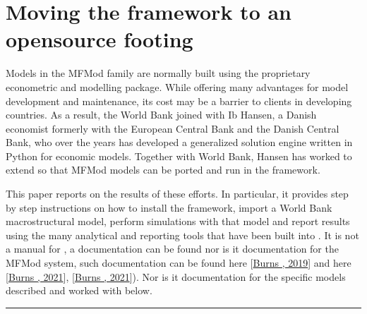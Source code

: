 \documentclass[letterpaper,10pt,english]{jupyterBook}
\begin{document}
\section{Moving the framework to an open\sphinxhyphen{}source footing}
\label{\detokenize{content/01_Introduction/Introduction:moving-the-framework-to-an-open-source-footing}}
\sphinxAtStartPar
Models in the MFMod family are normally built using the proprietary  econometric and modelling package. While offering many advantages for model development and maintenance, its cost may be a barrier to clients in developing countries.  As a result, the World Bank joined with Ib Hansen, a Danish economist formerly with the European Central Bank and the Danish Central Bank, who over the years has developed  a generalized solution engine written in Python for economic models. Together with World Bank, Hansen has worked to extend  so that MFMod models can be ported and run in the framework.

\sphinxAtStartPar
This paper reports on the results of these efforts. In particular, it provides step by step instructions on how to install the  framework, import a World Bank macrostructural model,  perform simulations with that model and report results using the many analytical and reporting tools that have been built into .  It is not a manual for , a documentation can be found  nor is it documentation for the MFMod system, such documentation can be found here {[}\hyperlink{cite.content/99_BackMatter/References:id15}{Burns , 2019}{]} and here {[}\hyperlink{cite.content/99_BackMatter/References:id18}{Burns , 2021}{]}, {[}\hyperlink{cite.content/99_BackMatter/References:id14}{Burns , 2021}{]}). Nor is it documentation for the specific models described and worked with below.


\bigskip\hrule\bigskip


\sphinxstepscope
\end{document}
